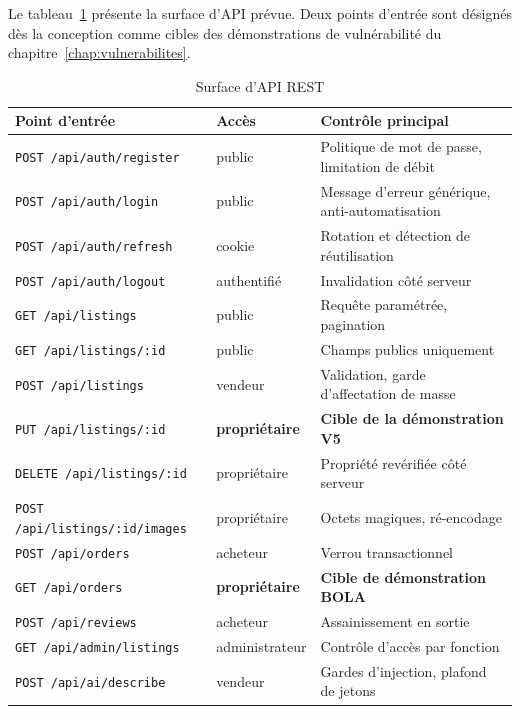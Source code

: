 Le tableau~\ref{tab:api} présente la surface d'API prévue. Deux points
d'entrée sont désignés dès la conception comme cibles des démonstrations de
vulnérabilité du chapitre~\ref{chap:vulnerabilites}.

\begin{table}[H]
\centering
\caption{Surface d'API REST}
\label{tab:api}
\small
\begin{tabular}{@{}llp{5.9cm}@{}}
\toprule
\textbf{Point d'entrée} & \textbf{Accès} & \textbf{Contrôle principal} \\
\midrule
\texttt{POST /api/auth/register}   & public & Politique de mot de passe, limitation de débit \\
\texttt{POST /api/auth/login}      & public & Message d'erreur générique, anti-automatisation \\
\texttt{POST /api/auth/refresh}    & cookie & Rotation et détection de réutilisation \\
\texttt{POST /api/auth/logout}     & authentifié & Invalidation côté serveur \\
\texttt{GET /api/listings}         & public & Requête paramétrée, pagination \\
\texttt{GET /api/listings/:id}     & public & Champs publics uniquement \\
\texttt{POST /api/listings}        & vendeur & Validation, garde d'affectation de masse \\
\texttt{PUT /api/listings/:id}     & \textbf{propriétaire} & \textbf{Cible de la démonstration V5} \\
\texttt{DELETE /api/listings/:id}  & propriétaire & Propriété revérifiée côté serveur \\
\texttt{POST /api/listings/:id/images} & propriétaire & Octets magiques, ré-encodage \\
\texttt{POST /api/orders}          & acheteur & Verrou transactionnel \\
\texttt{GET /api/orders}           & \textbf{propriétaire} & \textbf{Cible de démonstration BOLA} \\
\texttt{POST /api/reviews}         & acheteur & Assainissement en sortie \\
\texttt{GET /api/admin/listings}   & administrateur & Contrôle d'accès par fonction \\
\texttt{POST /api/ai/describe}     & vendeur & Gardes d'injection, plafond de jetons \\
\bottomrule
\end{tabular}
\end{table}

